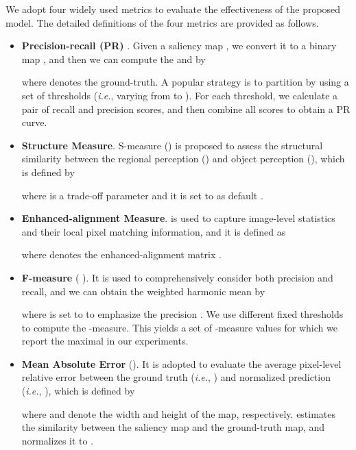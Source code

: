 \documentclass[10pt,twocolumn,letterpaper]{article}
\def\ie{\emph{i.e.}}
\begin{document}
We adopt four widely used metrics to evaluate the effectiveness of the proposed model. The detailed definitions of the four metrics are provided as follows.
\begin{itemize}{\setlength{\parsep}{-0.25ex}}

\item {\textbf{Precision-recall (PR)}} \cite{achanta2009frequency}. Given a saliency map , we convert it to a binary map , and then we can compute the 
and  by

where  denotes the ground-truth. A popular strategy is to partition  by using a set of thresholds (\ie, varying from  to ). For each threshold, we calculate a pair of recall and precision scores, and then combine all scores to obtain a PR curve.


\item \textbf{Structure Measure}. {S-measure} () \cite{fan2017structure} is proposed to assess the structural similarity between the regional perception () and object perception (), which is defined by

where  is a trade-off parameter and it is set to  as default \cite{fan2017structure}.

\item \textbf{Enhanced-alignment Measure}.  \cite{Fan2018Enhanced} is used to capture image-level statistics and their local pixel matching information, and it is defined as

where  denotes the enhanced-alignment matrix \cite{Fan2018Enhanced}.

\item \textbf{F-measure} ( \cite{achanta2009frequency}). It is used to comprehensively consider both precision and recall, and we can obtain the weighted harmonic mean by

where  is set to  to emphasize the precision \cite{achanta2009frequency}. We use different fixed  thresholds to compute the -measure. This yields a set of -measure values for which we report the maximal  in our experiments.

\item \textbf{Mean Absolute Error} (). It is adopted to evaluate the average pixel-level relative error between the ground truth (\ie, ) and normalized prediction (\ie, ), which is defined by

where  and  denote the width and height of the map, respectively.  estimates the similarity between the saliency map and the ground-truth map, and normalizes it to .\\

\end{itemize}
\end{document}
